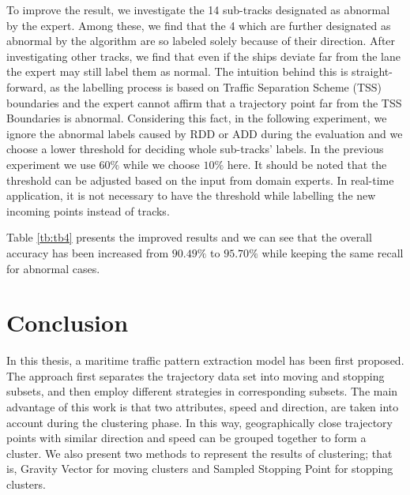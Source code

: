 \documentclass[12pt,glossary]{dalcsthesis}
\begin{document}
To improve the result, we investigate the 14 sub-tracks designated as abnormal by the expert. Among these, we find that the 4 which are further designated as abnormal by the algorithm are so labeled solely because of their direction. After investigating other tracks, we find that
even if the ships deviate far from the lane the expert may still label them as normal. The intuition behind this is straight-forward, as the labelling process is based on Traffic Separation Scheme (TSS) \cite{tss} boundaries and the expert cannot affirm that a trajectory point far from the TSS Boundaries is abnormal. %
Considering this fact, in the following experiment, we ignore the abnormal labels caused by RDD or ADD during the evaluation and we choose a lower threshold for deciding  whole sub-tracks' labels. In the previous experiment we use $60\%$ while we choose $10\%$ here. It should be noted that the threshold can be adjusted based on the input from domain experts. In real-time application, it is not necessary to have the threshold while labelling the new incoming points instead of tracks.

Table \ref{tb:tb4} presents the improved results and we can see that the overall accuracy has been increased from $90.49\%$ to $95.70\%$ while keeping the same recall for abnormal cases.




\chapter{Conclusion}
\label{ch:conclusion}


In this thesis, a maritime traffic pattern extraction model has been first proposed. The approach first separates the trajectory data set into moving and stopping subsets, and then employ different strategies in corresponding subsets. The main advantage of this work is that two attributes, speed and direction, are taken into account during the clustering phase. In this way, geographically close trajectory points with similar direction and speed can be grouped together to form a cluster. We also present two methods to represent the results of clustering; that is, Gravity Vector for moving clusters and Sampled Stopping Point for stopping clusters.  %
\end{document}
